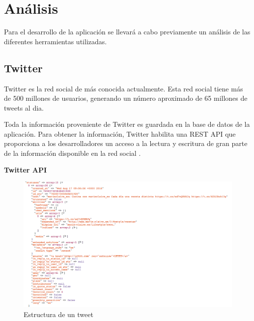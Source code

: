 \section{Análisis}

Para el desarrollo de la aplicación se llevará a cabo previamente un análisis de las diferentes herramientas utilizadas.

\subsection{Twitter}

Twitter es la red social de  más conocida actualmente. Esta red social tiene más de 500 millones de usuarios, generando un número
aproximado de 65 millones de tweets al dia.

\vspace{5 mm}

Toda la información proveniente de Twitter es guardada en la base de datos de la aplicación. Para obtener la información,
Twitter habilita una REST API que proporciona a los desarrolladores un acceso a la lectura y escritura de gran parte de la información disponible
en la red social \cite{twitter-api}.

\vspace{5 mm}

\textbf{Twitter API}

\vspace{5 mm}

\begin{landscape}
\begin{figure}
\begin{center}
\includegraphics[width=16cm]{imagenes/estructura-tweet.png}
\caption{Estructura de un tweet}
\label{tweet}
\end{center}
\end{figure}
\end{landscape}

